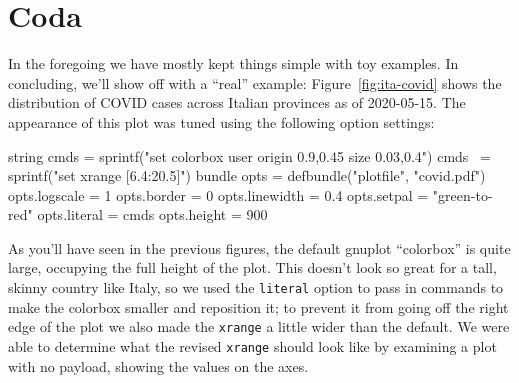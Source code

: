 \documentclass{article}
\begin{document}
\section*{Coda}

In the foregoing we have mostly kept things simple with toy
examples. In concluding, we'll show off with a ``real'' example:
Figure~\ref{fig:ita-covid} shows the distribution of COVID cases
across Italian provinces as of 2020-05-15. The appearance of this plot
was tuned using the following option settings:
\begin{code}
string cmds = sprintf("set colorbox user origin 0.9,0.45 size 0.03,0.4\n")
cmds ~= sprintf("set xrange [6.4:20.5]")
bundle opts = defbundle("plotfile", "covid.pdf")
opts.logscale = 1
opts.border = 0
opts.linewidth = 0.4
opts.setpal = "green-to-red"
opts.literal = cmds
opts.height = 900
\end{code}

As you'll have seen in the previous figures, the default
\textsf{gnuplot} ``colorbox'' is quite large, occupying the full
height of the plot.  This doesn't look so great for a tall, skinny
country like Italy, so we used the \texttt{literal} option to pass in
commands to make the colorbox smaller and reposition it; to prevent it
from going off the right edge of the plot we also made the
\texttt{xrange} a little wider than the default. We were able to
determine what the revised \texttt{xrange} should look like by
examining a plot with no payload, showing the values on the axes.
\end{document}
